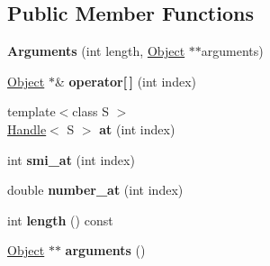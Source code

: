 \subsection*{Public Member Functions}
\begin{DoxyCompactItemize}
\item 
{\bfseries Arguments} (int length, \hyperlink{classv8_1_1internal_1_1_object}{Object} $\ast$$\ast$arguments)\hypertarget{classv8_1_1internal_1_1_b_a_s_e___e_m_b_e_d_d_e_d_a61a25849aea8e3dfc16e9198106b98dd}{}\label{classv8_1_1internal_1_1_b_a_s_e___e_m_b_e_d_d_e_d_a61a25849aea8e3dfc16e9198106b98dd}

\item 
\hyperlink{classv8_1_1internal_1_1_object}{Object} $\ast$\& {\bfseries operator\mbox{[}$\,$\mbox{]}} (int index)\hypertarget{classv8_1_1internal_1_1_b_a_s_e___e_m_b_e_d_d_e_d_a23b2bd1c71987f58d06e3aaa1eed23ac}{}\label{classv8_1_1internal_1_1_b_a_s_e___e_m_b_e_d_d_e_d_a23b2bd1c71987f58d06e3aaa1eed23ac}

\item 
{\footnotesize template$<$class S $>$ }\\\hyperlink{classv8_1_1internal_1_1_handle}{Handle}$<$ S $>$ {\bfseries at} (int index)\hypertarget{classv8_1_1internal_1_1_b_a_s_e___e_m_b_e_d_d_e_d_a867a6fb6105ea573bd7256ab312aa7cd}{}\label{classv8_1_1internal_1_1_b_a_s_e___e_m_b_e_d_d_e_d_a867a6fb6105ea573bd7256ab312aa7cd}

\item 
int {\bfseries smi\+\_\+at} (int index)\hypertarget{classv8_1_1internal_1_1_b_a_s_e___e_m_b_e_d_d_e_d_aa8f634b097d83f88327630a320ffba10}{}\label{classv8_1_1internal_1_1_b_a_s_e___e_m_b_e_d_d_e_d_aa8f634b097d83f88327630a320ffba10}

\item 
double {\bfseries number\+\_\+at} (int index)\hypertarget{classv8_1_1internal_1_1_b_a_s_e___e_m_b_e_d_d_e_d_a32fe4c9bc552028cc7faaa5bec934c8d}{}\label{classv8_1_1internal_1_1_b_a_s_e___e_m_b_e_d_d_e_d_a32fe4c9bc552028cc7faaa5bec934c8d}

\item 
int {\bfseries length} () const \hypertarget{classv8_1_1internal_1_1_b_a_s_e___e_m_b_e_d_d_e_d_aa7027183c54054ccb6f2992d693e88bc}{}\label{classv8_1_1internal_1_1_b_a_s_e___e_m_b_e_d_d_e_d_aa7027183c54054ccb6f2992d693e88bc}

\item 
\hyperlink{classv8_1_1internal_1_1_object}{Object} $\ast$$\ast$ {\bfseries arguments} ()\hypertarget{classv8_1_1internal_1_1_b_a_s_e___e_m_b_e_d_d_e_d_ab2873c2ec315e7fadceb5c42af445fbc}{}\label{classv8_1_1internal_1_1_b_a_s_e___e_m_b_e_d_d_e_d_ab2873c2ec315e7fadceb5c42af445fbc}


\end{DoxyCompactItemize}
